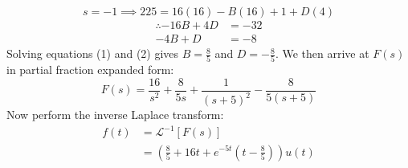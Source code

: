 \begin{enumerate}
{\begin{equation*}
			s = -1 \implies 225 = 16(16) - B(16) + 1 + D(4)
		\end{equation*}
		\begin{align}
			\therefore -16B + 4D &= -32 \nonumber \\
			-4B + D &= -8
		\end{align}
		Solving equations (1) and (2) gives $B = \frac{8}{5}$ and $D = -\frac{8}{5}$. We then arrive at $F(s)$ in partial fraction expanded form:
		\begin{equation*}
			F(s) = \frac{16}{s^2} + \frac{8}{5s} + \frac{1}{(s+5)^2} - \frac{8}{5(s+5)}
		\end{equation*}
		Now perform the inverse Laplace transform:
		\begin{align*}
			f(t) &= \mathcal{L}^{-1}[F(s)] \\
			&= \left(\frac{8}{5} + 16t + e^{-5t} \left(t - \frac{8}{5} \right) \right) u(t)
		\end{align*}
		\\
	}
	
\end{enumerate}
